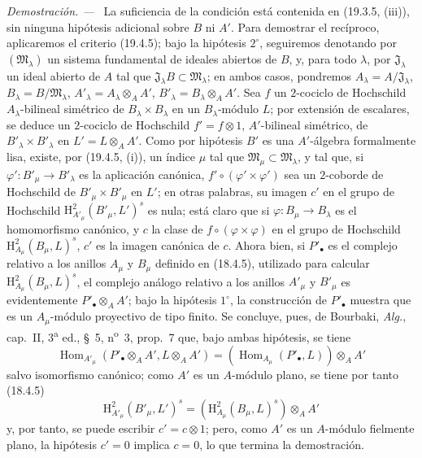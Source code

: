 \documentclass[10pt,oneside]{book}
\newenvironment{proof}{%
  \par\medskip\noindent\textit{Demostración. ---\ }}{\par}
\begin{document}
\begin{proof}
La suficiencia de la condición está contenida en (19.3.5, (iii)), sin ninguna
hipótesis adicional sobre $B$ ni $A'$. Para demostrar el recíproco,
aplicaremos el criterio (19.4.5); bajo la hipótesis $2^\circ$,
seguiremos denotando por $(\mathfrak M_\lambda)$ un sistema fundamental
de ideales abiertos de $B$, y, para todo $\lambda$, por
$\mathfrak J_\lambda$ un ideal abierto de $A$ tal que
$\mathfrak J_\lambda B\subset\mathfrak M_\lambda$; en ambos
casos, pondremos
$A_\lambda=A/\mathfrak J_\lambda$,
$B_\lambda=B/\mathfrak M_\lambda$,
$A'_\lambda=A_\lambda\otimes_A A'$,
$B'_\lambda=B_\lambda\otimes_A A'$. Sea $f$ un $2$-cociclo de
Hochschild $A_\lambda$-bilineal simétrico de
$B_\lambda\times B_\lambda$ en un $B_\lambda$-módulo $L$; por
extensión de escalares, se deduce un $2$-cociclo de Hochschild
$f'=f\otimes1$, $A'$-bilineal simétrico, de
$B'_\lambda\times B'_\lambda$ en $L'=L\otimes_A A'$. Como por
hipótesis $B'$ es una $A'$-álgebra formalmente lisa, existe, por (19.4.5,
(i)), un índice $\mu$ tal que
$\mathfrak M_\mu\subset\mathfrak M_\lambda$, y tal que, si
$\varphi':B'_\mu\to B'_\lambda$ es la aplicación canónica,
$f'\circ(\varphi'\times\varphi')$ sea un $2$-coborde de Hochschild de
$B'_\mu\times B'_\mu$ en $L'$; en otras palabras, su imagen $c'$ en el
grupo de Hochschild
$\mathrm H^2_{A'_\mu}(B'_\mu,L')^s$ es nula; está claro que si
$\varphi:B_\mu\to B_\lambda$ es el homomorfismo canónico, y $c$ la
clase de $f\circ(\varphi\times\varphi)$ en el grupo de Hochschild
$\mathrm H^2_{A_\mu}(B_\mu,L)^s$, $c'$ es la imagen canónica de $c$.
Ahora bien, si $P'_\bullet$ es el complejo relativo a los anillos $A_\mu$ y
$B_\mu$ definido en (18.4.5), utilizado para calcular
$\mathrm H^2_{A_\mu}(B_\mu,L)^s$, el complejo análogo relativo a los
anillos $A'_\mu$ y $B'_\mu$ es evidentemente
$P'_\bullet\otimes_A A'$; bajo la hipótesis $1^\circ$, la construcción de
$P'_\bullet$ muestra que es un $A_\mu$-módulo proyectivo de tipo finito.
Se concluye, pues, de Bourbaki, \emph{Alg.}, cap.~II, 3\textsuperscript{a} ed., §~5,
n\textsuperscript{o}~3, prop.~7 que, bajo ambas hipótesis, se tiene
\[
  \operatorname{Hom}_{A'_\mu}(P'_\bullet\otimes_A A',L\otimes_A A')
  =(\operatorname{Hom}_{A_\mu}(P'_\bullet,L))\otimes_A A'
\]
salvo isomorfismo canónico; como $A'$ es un $A$-módulo plano, se tiene por
tanto (18.4.5)
\[
  \mathrm H^2_{A'_\mu}(B'_\mu,L')^s
  =(\mathrm H^2_{A_\mu}(B_\mu,L)^s)\otimes_A A'
\]
y, por tanto, se puede escribir $c'=c\otimes1$; pero, como $A'$ es un $A$-módulo
fielmente plano, la hipótesis $c'=0$ implica $c=0$, lo que termina la
demostración.
\end{proof}
\end{document}
